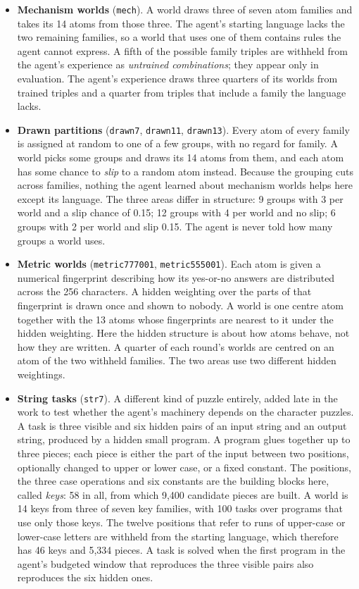 \documentclass[11pt]{article}
\begin{document}
\begin{itemize}[leftmargin=*]
\item \textbf{Mechanism worlds} (\texttt{mech}). A world draws three of seven atom families and takes its 14 atoms from those three. The agent's starting language lacks the two remaining families, so a world that uses one of them contains rules the agent cannot express. A fifth of the possible family triples are withheld from the agent's experience as \emph{untrained combinations}; they appear only in evaluation. The agent's experience draws three quarters of its worlds from trained triples and a quarter from triples that include a family the language lacks.
\item \textbf{Drawn partitions} (\texttt{drawn7}, \texttt{drawn11}, \texttt{drawn13}). Every atom of every family is assigned at random to one of a few groups, with no regard for family. A world picks some groups and draws its 14 atoms from them, and each atom has some chance to \emph{slip} to a random atom instead. Because the grouping cuts across families, nothing the agent learned about mechanism worlds helps here except its language. The three areas differ in structure: 9 groups with 3 per world and a slip chance of 0.15; 12 groups with 4 per world and no slip; 6 groups with 2 per world and slip 0.15. The agent is never told how many groups a world uses.
\item \textbf{Metric worlds} (\texttt{metric777001}, \texttt{metric555001}). Each atom is given a numerical fingerprint describing how its yes-or-no answers are distributed across the 256 characters. A hidden weighting over the parts of that fingerprint is drawn once and shown to nobody. A world is one centre atom together with the 13 atoms whose fingerprints are nearest to it under the hidden weighting. Here the hidden structure is about how atoms behave, not how they are written. A quarter of each round's worlds are centred on an atom of the two withheld families. The two areas use two different hidden weightings.
\item \textbf{String tasks} (\texttt{str7}). A different kind of puzzle entirely, added late in the work to test whether the agent's machinery depends on the character puzzles. A task is three visible and six hidden pairs of an input string and an output string, produced by a hidden small program. A program glues together up to three pieces; each piece is either the part of the input between two positions, optionally changed to upper or lower case, or a fixed constant. The positions, the three case operations and six constants are the building blocks here, called \emph{keys}: 58 in all, from which 9,400 candidate pieces are built. A world is 14 keys from three of seven key families, with 100 tasks over programs that use only those keys. The twelve positions that refer to runs of upper-case or lower-case letters are withheld from the starting language, which therefore has 46 keys and 5,334 pieces. A task is solved when the first program in the agent's budgeted window that reproduces the three visible pairs also reproduces the six hidden ones.
\end{itemize}
\end{document}
